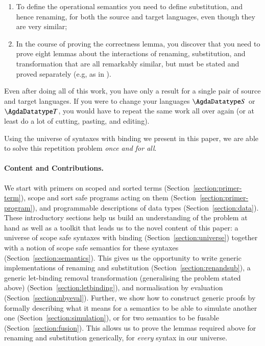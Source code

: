 \begin{enumerate}
\item To define the operational semantics you need to define
  substitution, and hence renaming, for both the source and target
  languages, even though they are very similar;
\item In the course of proving the correctness lemma, you discover
  that you need to prove eight lemmas about the interactions of
  renaming, substitution, and transformation that are all remarkably
  similar, but must be stated and proved separately (e.g, as in
  \cite{benton2012strongly}).
\end{enumerate}

Even after doing all of this work, you have only a result for a single
pair of source and target languages. If you were to change your
languages $\AD{S}$ or $\AD{T}$, you would have to repeat the same work
all over again (or at least do a lot of cutting, pasting, and
editing).

Using the universe of syntaxes with binding we present in this paper,
we are able to solve this repetition problem \emph{once and for all}.


\paragraph{Content and Contributions.}
We start with primers on scoped and sorted terms
(Section~\ref{section:primer-term}), scope and sort safe programs
acting on them (Section~\ref{section:primer-program}), and
programmable descriptions of data types (Section~\ref{section:data}).
These introductory sections help us build an understanding of the
problem at hand as well as a toolkit that leads us to the novel
content of this paper: a universe of scope safe syntaxes with binding
(Section~\ref{section:universe}) together with a notion of scope safe
semantics for these syntaxes (Section~\ref{section:semantics}).  This
gives us the opportunity to write generic implementations of renaming
and substitution (Section~\ref{section:renandsub}), a generic
let-binding removal transformation (generalising the problem stated
above) (Section~\ref{section:letbinding}), and normalisation by
evaluation (Section~\ref{section:nbyeval}). Further, we show how to
construct generic proofs by formally describing what it means for a
semantics to be able to simulate another one
(Section~\ref{section:simulation}), or for two semantics to be fusable
(Section~\ref{section:fusion}). This allows us to prove the lemmas
required above for renaming and substitution generically, for
\emph{every} syntax in our universe.


